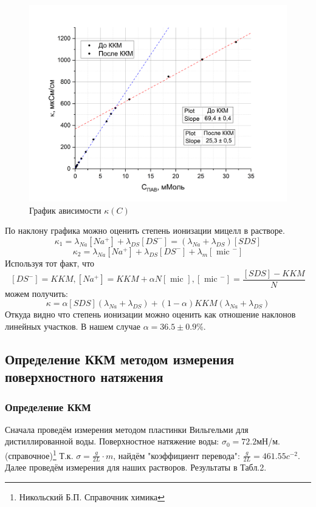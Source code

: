 \documentclass[a4paper, 12pt]{article}
\begin{document}
\begin{figure}[h!]
    \begin{center}
    \includegraphics[width=1\textwidth]{conduct.png}
    \end{center}
    \caption{График ависимости $\kappa(C)$}
\end{figure}

По наклону графика можно оценить степень ионизации мицелл в растворе.
$$\kappa_{1}=\lambda_{N a}\left[N a^{+}\right]+\lambda_{D S}\left[D S^{-}\right]=\left(\lambda_{N a}+\lambda_{D S}\right)[S D S]$$
$$
\kappa_{2}=\lambda_{N a}\left[N a^{+}\right]+\lambda_{D S}\left[D S^{-}\right]+\lambda_{m}\left[\text { mic }^{-}\right]
$$
Используя тот факт, что 
$$
\left[D S^{-}\right]=K K M, 
\left[N a^{+}\right]=K K M+\alpha N[\text { mic }],
\left[\text { mic }^{-}\right]=\frac{[S D S]-K K M}{N}
$$
можем получить:
$$
\kappa=\alpha[S D S]\left(\lambda_{N a}+\lambda_{D S}\right)+(1-\alpha) K K M\left(\lambda_{N a}+\lambda_{D S}\right)
$$
Откуда видно что степень ионизации можно оценить как отношение наклонов линейных участков. В нашем случае $\alpha = 36.5 \pm 0.9$\%.







\subsection{Определение ККМ методом измерения поверхностного натяжения}
\subsubsection{Определение ККМ}
Сначала проведём измерения методом пластинки Вильгельми для дистиллированной воды. Поверхностное натяжение воды: $\sigma_0=72.2$мН/м. (справочное)\footnote{Никольский Б.П. Справочник химика} Т.к. $\sigma = \frac{g}{2L}\cdot{m}$, найдём "коэффициент перевода": $\frac{g}{2L}=461.55c^{-2}$. Далее проведём измерения для наших растворов. Результаты в Табл.2.
\end{document}
